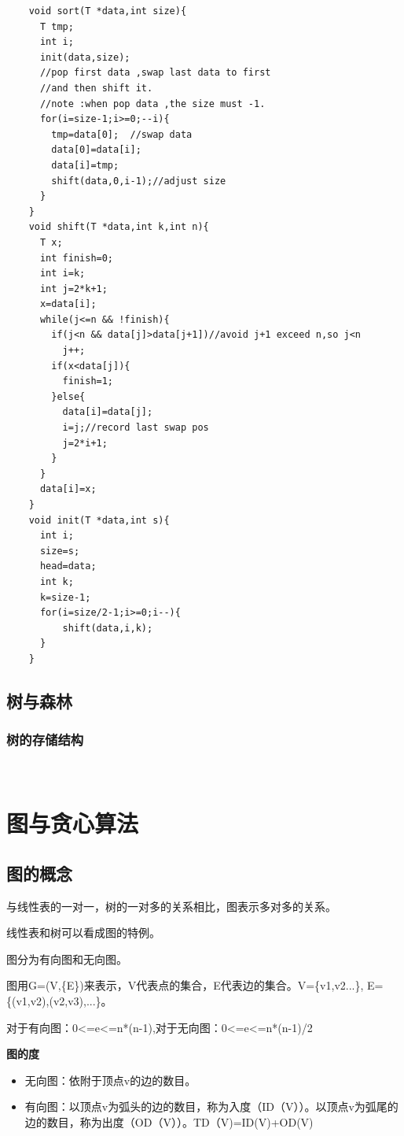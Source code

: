 \documentclass{article}
\begin{document}
		\begin{verbatim}
    void sort(T *data,int size){
      T tmp;
      int i;
      init(data,size);
      //pop first data ,swap last data to first 
      //and then shift it.
      //note :when pop data ,the size must -1.
      for(i=size-1;i>=0;--i){
        tmp=data[0];  //swap data 
        data[0]=data[i];
        data[i]=tmp;
        shift(data,0,i-1);//adjust size
      }
    }
    void shift(T *data,int k,int n){
      T x;
      int finish=0;
      int i=k;
      int j=2*k+1;
      x=data[i];
      while(j<=n && !finish){
        if(j<n && data[j]>data[j+1])//avoid j+1 exceed n,so j<n
          j++;
        if(x<data[j]){
          finish=1;
        }else{
          data[i]=data[j];
          i=j;//record last swap pos
          j=2*i+1;
        }
      }
      data[i]=x;
    }
    void init(T *data,int s){
      int i;
      size=s;
      head=data;
      int k;
      k=size-1;
      for(i=size/2-1;i>=0;i--){
          shift(data,i,k);
      }
    }
		\end{verbatim}

	\subsection{树与森林}
	\subsubsection{树的存储结构}



	\	
\section{图与贪心算法}
	\subsection{图的概念}
		与线性表的一对一，树的一对多的关系相比，图表示多对多的关系。

		线性表和树可以看成图的特例。

		图分为有向图和无向图。

		图用G=(V,\{E\})来表示，V代表点的集合，E代表边的集合。V=\{v1,v2...\},
		E=\{(v1,v2),(v2,v3),...\}。

		对于有向图：0<=e<=n*(n-1),对于无向图：0<=e<=n*(n-1)/2

		\textbf{图的度}
		\begin{itemize}
			\item 无向图：依附于顶点v的边的数目。
			\item 有向图：以顶点v为弧头的边的数目，称为入度（ID（V））。以顶点v为弧尾的边的数目，称为出度（OD（V））。TD（V)=ID(V)+OD(V)
		\end{itemize}
\end{document}
